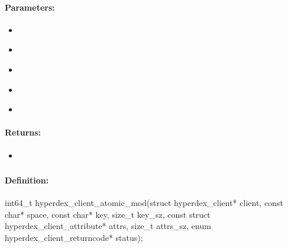 \paragraph{Parameters:}
\begin{itemize}[noitemsep]
\item {}\\

\item {}\\

\item {}\\

\item {}\\

\item {}\\

\end{itemize}

\paragraph{Returns:}
\begin{itemize}[noitemsep]
\item {}\\

\end{itemize}

\pagebreak
\subsubsection{}
\label{api:c:atomic_mod}


\paragraph{Definition:}
\begin{ccode}
int64_t hyperdex_client_atomic_mod(struct hyperdex_client* client,
        const char* space,
        const char* key, size_t key_sz,
        const struct hyperdex_client_attribute* attrs, size_t attrs_sz,
        enum hyperdex_client_returncode* status);
\end{ccode}

